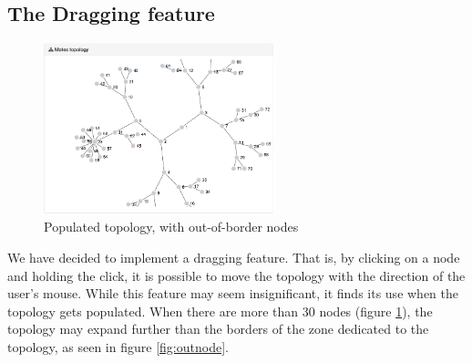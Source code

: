 \subsection{The Dragging feature}

\begin{figure}[!h]
	\centering
	\includegraphics[width=0.6\textwidth]{res/populated.png}
	\caption{Populated topology, with out-of-border nodes}
	\label{fig:populated}
\end{figure}


We have decided to implement a dragging feature. That is, by clicking on a node and holding the click, it is possible to move the topology with the direction of the user's mouse. While this feature may seem insignificant, it finds its use when the topology gets populated. When there are more than 30 nodes (figure \ref{fig:populated}), the topology may expand further than the borders of the zone dedicated to the topology, as seen in figure \ref{fig:outnode}.\\



